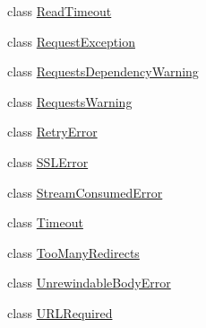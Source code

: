 \begin{DoxyCompactItemize}
\item 
class \hyperlink{classpip_1_1__vendor_1_1requests_1_1exceptions_1_1ReadTimeout}{Read\+Timeout}
\item 
class \hyperlink{classpip_1_1__vendor_1_1requests_1_1exceptions_1_1RequestException}{Request\+Exception}
\item 
class \hyperlink{classpip_1_1__vendor_1_1requests_1_1exceptions_1_1RequestsDependencyWarning}{Requests\+Dependency\+Warning}
\item 
class \hyperlink{classpip_1_1__vendor_1_1requests_1_1exceptions_1_1RequestsWarning}{Requests\+Warning}
\item 
class \hyperlink{classpip_1_1__vendor_1_1requests_1_1exceptions_1_1RetryError}{Retry\+Error}
\item 
class \hyperlink{classpip_1_1__vendor_1_1requests_1_1exceptions_1_1SSLError}{S\+S\+L\+Error}
\item 
class \hyperlink{classpip_1_1__vendor_1_1requests_1_1exceptions_1_1StreamConsumedError}{Stream\+Consumed\+Error}
\item 
class \hyperlink{classpip_1_1__vendor_1_1requests_1_1exceptions_1_1Timeout}{Timeout}
\item 
class \hyperlink{classpip_1_1__vendor_1_1requests_1_1exceptions_1_1TooManyRedirects}{Too\+Many\+Redirects}
\item 
class \hyperlink{classpip_1_1__vendor_1_1requests_1_1exceptions_1_1UnrewindableBodyError}{Unrewindable\+Body\+Error}
\item 
class \hyperlink{classpip_1_1__vendor_1_1requests_1_1exceptions_1_1URLRequired}{U\+R\+L\+Required}
\end{DoxyCompactItemize}
